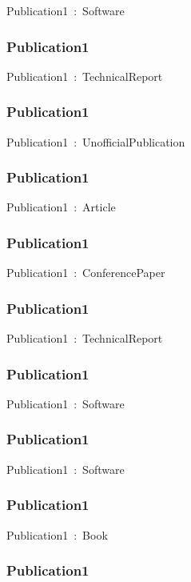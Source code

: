\documentclass{article}
\begin{document}
Publication1~:~Software

\subsubsection*{Publication1}

Publication1~:~TechnicalReport

\subsubsection*{Publication1}

Publication1~:~UnofficialPublication

\subsubsection*{Publication1}

Publication1~:~Article

\subsubsection*{Publication1}

Publication1~:~ConferencePaper

\subsubsection*{Publication1}

Publication1~:~TechnicalReport

\subsubsection*{Publication1}

Publication1~:~Software

\subsubsection*{Publication1}

Publication1~:~Software

\subsubsection*{Publication1}

Publication1~:~Book

\subsubsection*{Publication1}
\end{document}
